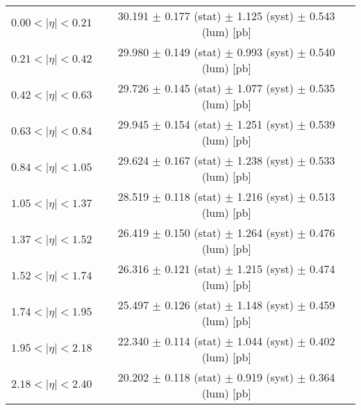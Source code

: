 \begin{tabular}{lc}
\hline
$0.00 < |\eta| <0.21$          & 30.191 $\pm$ 0.177 (stat) $\pm$ 1.125 (syst) $\pm$ 0.543 (lum) [pb]  \\
$0.21 < |\eta| <0.42$          & 29.980 $\pm$ 0.149 (stat) $\pm$ 0.993 (syst) $\pm$ 0.540 (lum) [pb]  \\
$0.42 < |\eta| <0.63$          & 29.726 $\pm$ 0.145 (stat) $\pm$ 1.077 (syst) $\pm$ 0.535 (lum) [pb]  \\
$0.63 < |\eta| <0.84$          & 29.945 $\pm$ 0.154 (stat) $\pm$ 1.251 (syst) $\pm$ 0.539 (lum) [pb]  \\
$0.84 < |\eta| <1.05$          & 29.624 $\pm$ 0.167 (stat) $\pm$ 1.238 (syst) $\pm$ 0.533 (lum) [pb]  \\
$1.05 < |\eta| <1.37$          & 28.519 $\pm$ 0.118 (stat) $\pm$ 1.216 (syst) $\pm$ 0.513 (lum) [pb]  \\
$1.37 < |\eta| <1.52$          & 26.419 $\pm$ 0.150 (stat) $\pm$ 1.264 (syst) $\pm$ 0.476 (lum) [pb]  \\
$1.52 < |\eta| <1.74$          & 26.316 $\pm$ 0.121 (stat) $\pm$ 1.215 (syst) $\pm$ 0.474 (lum) [pb]  \\
$1.74 < |\eta| <1.95$          & 25.497 $\pm$ 0.126 (stat) $\pm$ 1.148 (syst) $\pm$ 0.459 (lum) [pb]  \\
$1.95 < |\eta| <2.18$          & 22.340 $\pm$ 0.114 (stat) $\pm$ 1.044 (syst) $\pm$ 0.402 (lum) [pb]  \\
$2.18 < |\eta| <2.40$          & 20.202 $\pm$ 0.118 (stat) $\pm$ 0.919 (syst) $\pm$ 0.364 (lum) [pb]  \\
\hline
\end{tabular}
